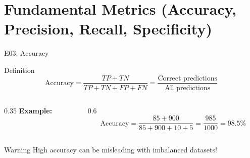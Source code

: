 \documentclass[aspectratio=169, 10pt]{beamer}
\begin{document}
\section{Fundamental Metrics (Accuracy, Precision, Recall, Specificity)}

\begin{frame}{E03: Accuracy}

    \begin{block}{Definition}
        \[
        \text{Accuracy} = \frac{TP + TN}{TP + TN + FP + FN} = \frac{\text{Correct predictions}}{\text{All predictions}}
        \]
    \end{block}

    \vspace{1mm}

    \begin{columns}[T]
        \begin{column}{0.35\textwidth}
            \textbf{Example:}
            \begin{center}
            \end{center}
        \end{column}
        \begin{column}{0.6\textwidth}
            \[
            \text{Accuracy} = \frac{85 + 900}{85 + 900 + 10 + 5} = \frac{985}{1000} = 98.5\%
            \]
        \end{column}
    \end{columns}

    \vspace{2mm}

    \begin{alertblock}{Warning}
        High accuracy can be misleading with imbalanced datasets!
    \end{alertblock}

\end{frame}
\end{document}
